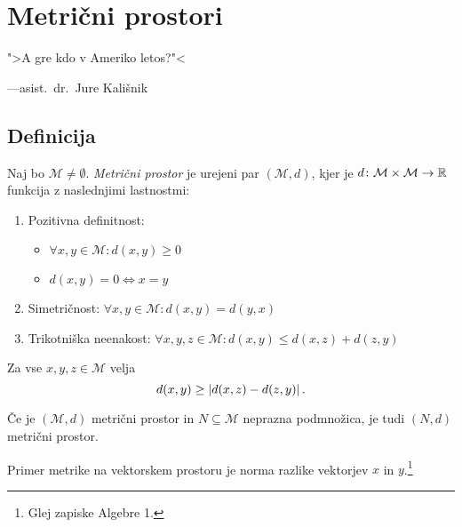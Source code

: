 \documentclass[12pt, a4paper]{article}
\begin{document}
\newpage

\section{Metrični prostori}

\epigraph{">A gre kdo v Ameriko letos?"<}{---asist.~dr.~Jure Kališnik}

\subsection{Definicija}

\begin{okvir}
\begin{definicija}
Naj bo $\mathcal{M}\ne\emptyset$. \emph{Metrični prostor} je urejeni par $(\mathcal{M},d)$, kjer je $d\colon \mathcal{M}\times \mathcal{M}\to\mathbb{R}$ funkcija z naslednjimi lastnostmi:

\begin{enumerate}
\item Pozitivna definitnost:

\begin{itemize}
\item $\forall x,y\in \mathcal{M}\colon d(x,y)\geq 0$
\item $d(x,y)=0\iff x=y$
\end{itemize}

\item Simetričnost: $\forall x,y\in \mathcal{M}\colon d(x,y)=d(y,x)$
\item Trikotniška neenakost: $\forall x,y,z\in \mathcal{M}\colon d(x,y)\leq d(x,z)+d(z,y)$
\end{enumerate}
\end{definicija}
\end{okvir}

\begin{opomba}
Za vse $x,y,z\in \mathcal{M}$ velja
\[
d(x,y)\geq\left\lvert d(x,z)-d(z,y)\right\rvert.
\]
\end{opomba}

\begin{opomba}
Če je $(\mathcal{M},d)$ metrični prostor in $N\subseteq \mathcal{M}$ neprazna podmnožica, je tudi $(N,d)$ metrični prostor.
\end{opomba}

\begin{opomba}
Primer metrike na vektorskem prostoru je norma razlike vektorjev $x$ in $y$.\footnote{Glej zapiske Algebre 1.}
\end{opomba}
\end{document}

